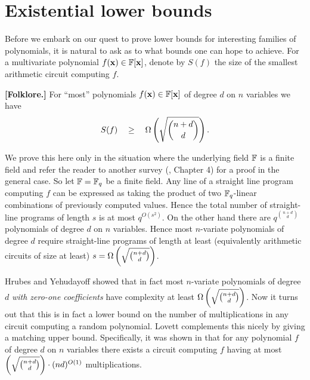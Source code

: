 \section{Existential lower bounds}\label{sec:random}
Before we embark on our quest to prove lower bounds for interesting
families of polynomials, it is natural to ask as to what bounds
one can hope to achieve.  For a multivariate polynomial 
$f(\mathbf{x}) \in \mathbb{F}[\mathbf{x}]$, denote by $S(f)$ the size of 
the smallest arithmetic circuit computing
$f$.  
\begin{theorem}
	{\bf [Folklore.]}
  For ``most'' polynomials $f(\mathbf{x}) \in \mathbb{F}[\mathbf{x}]$ of degree $d$ 
  on $n$ variables we have 
  $$ S(f) \quad\geq\quad \Omega \left(\sqrt{\binom{n + d}{d}}\right). $$
\end{theorem}
\begin{proof-sketch}
  We prove this here only in the situation where the underlying field
  $\mathbb{F}$ is a finite field and refer the reader to another survey
  (\cite{ckw11}, Chapter 4) for a proof in the general case. So let
  $\mathbb{F} = \mathbb{F}_{q}$ be a finite field. Any line of a straight line
  program computing $f$ can be expressed as taking the product of two
  $\mathbb{F}_q$-linear combinations of previously computed values. Hence the
  total number of straight-line programs of length $s$ is at most
  $q^{O(s^2)}$. On the other hand there are $q^{\binom{n+d}{d}}$
  polynomials of degree $d$ on $n$ variables.  Hence most $n$-variate
  polynomials of degree $d$ require straight-line programs of length
  at least (equivalently arithmetic circuits of size at least) $s =
  \Omega \left(\sqrt{\binom{n+d}{d}}\right)$.
	\end{proof-sketch}
	
\noindent	Hrubes and Yehudayoff \cite {hy11} showed that in fact 
	most $n$-variate polynomials of degree $d$ {\em with zero-one 
	coefficients} have complexity at least $\Omega\left(\sqrt{\binom{n+d}{d}}\right)$. 
	Now it turns out that this is in fact a lower bound on the 
	number of multiplications in any circuit computing a random 
	polynomial. Lovett \cite{lovett11} complements this 
	nicely by giving a matching upper bound. Specifically, 
	it was shown in \cite{lovett11} that for any polynomial $f$ 
	of degree $d$ on $n$ variables there exists a circuit computing 
	$f$ having at most $\left(\sqrt{\binom{n + d}{d}}\right) \cdot (nd)^{O(1)} $ 
	multiplications.



